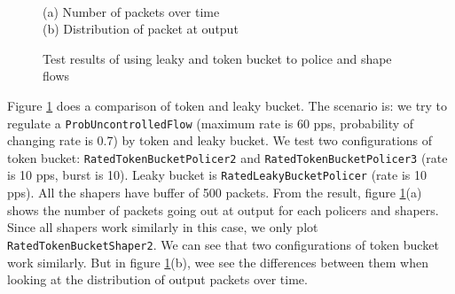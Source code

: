 \documentclass[a4paper]{article}
\begin{document}
  \begin{figure}
      \centering
      \\(a) Number of packets over time
      \\(b) Distribution of packet at output
      
      \caption{Test results of using leaky and token bucket to police and shape flows}
      \label{fig:test-lk-tk}
  \end{figure}

  Figure \ref{fig:test-lk-tk} does a comparison of token and leaky bucket. The scenario is: we try to regulate a \texttt{ProbUncontrolledFlow}  (maximum rate is 60 pps, probability of changing rate is 0.7) by token and leaky bucket. We test two configurations of token bucket: \texttt{RatedTokenBucketPolicer2} and \texttt{RatedTokenBucketPolicer3} (rate is 10 pps, burst is 10). Leaky bucket is \texttt{RatedLeakyBucketPolicer} (rate is 10 pps). All the shapers have buffer of 500 packets. From the result, figure \ref{fig:test-lk-tk}(a) shows the number of packets going out at output for each policers and shapers. Since all shapers work similarly in this case, we only plot \texttt{RatedTokenBucketShaper2}. We can see that two configurations of token bucket work similarly. But in figure \ref{fig:test-lk-tk}(b), wee see the differences between them when looking at the distribution of output packets over time.
\end{document}
